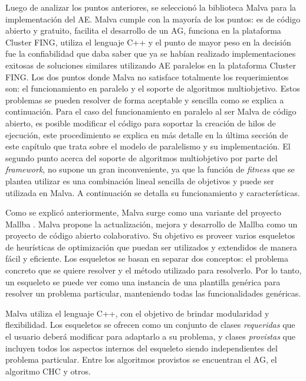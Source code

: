 Luego de analizar los puntos anteriores, se seleccionó la biblioteca Malva para la implementación del AE. Malva cumple con la mayoría de los puntos: es de código abierto y gratuito, facilita el desarrollo de un AG, funciona en la plataforma Cluster FING, utiliza el lenguaje C++ y el punto de mayor peso en la decisión fue la confiabilidad que daba saber que ya se habían realizado implementaciones exitosas de soluciones similares utilizando AE paralelos en la plataforma Cluster FING. Los dos puntos donde Malva no satisface totalmente los requerimientos son: el funcionamiento en paralelo y el soporte de algoritmos multiobjetivo. Estos problemas se pueden resolver de forma aceptable y sencilla como se explica a continuación. Para el caso del funcionamiento en paralelo al ser Malva de código abierto, es posible modificar el código para soportar la creación de hilos de ejecución, este procedimiento se explica en más detalle en la última sección de este capítulo que trata sobre el modelo de paralelismo y su implementación. El segundo punto acerca del soporte de algoritmos multiobjetivo por parte del \emph{framework}, no supone un gran inconveniente, ya que la función de \emph{fitness} que se plantea utilizar es una combinación lineal sencilla de objetivos y puede ser utilizada en Malva. 
A continuación se detalla su funcionamiento y características.

Como se explicó anteriormente, Malva \citep {Malva} surge como una variante del proyecto Mallba \citep{Mallba}. Malva propone la actualización, mejora y desarrollo de Mallba como un proyecto de código abierto colaborativo.  Su objetivo es proveer varios esqueletos de heurísticas de optimización que puedan ser utilizados y extendidos de manera fácil y eficiente. Los esqueletos se basan en separar dos conceptos: el problema concreto que se quiere resolver y el método utilizado para resolverlo. Por lo tanto, un esqueleto se puede ver como una instancia de una plantilla genérica para resolver un problema particular, manteniendo todas las funcionalidades genéricas.

Malva utiliza el lenguaje C++, con el objetivo de brindar modularidad y flexibilidad. Los esqueletos se ofrecen como un conjunto de clases \emph{requeridas} que el usuario deberá modificar para adaptarlo a su problema, y clases \emph{provistas} que incluyen todos los aspectos internos del esqueleto siendo  independientes del problema particular. Entre los algoritmos provistos se encuentran el AG, el algoritmo CHC \citep{CHC} y otros.

\newpage
